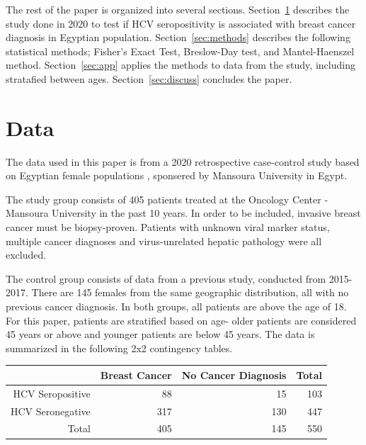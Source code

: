 \documentclass[12pt, titlepage]{article}
\begin{document}
The rest of the paper is organized into several sections. Section~\ref{sec:data}
describes the study done in 2020 to test if HCV seropositivity is associated with 
breast cancer diagnosis in Egyptian population. Section~\ref{sec:methods} 
describes the following statistical methods; Fisher's Exact Test, Breslow-Day test,
and Mantel-Haenszel method. Section~\ref{sec:app} applies the methods to data 
from the study, including stratafied between ages. Section~\ref{sec:discuss} 
concludes the paper.



\section{Data}
\label{sec:data}

The data used in this paper is from a 2020 retrospective case-control 
study based on Egyptian female populations \citep{2020association},
sponsered by Mansoura University in Egypt.

The study group consists of 405 patients treated at the Oncology Center 
- Mansoura University in the past 10 years. In order to be included, 
invasive breast cancer must be biopsy-proven. Patients with unknown 
viral marker status, multiple cancer diagnoses and virus-unrelated 
hepatic pathology were all excluded. 

The control group consists of 
data from a previous study, conducted from 2015-2017. There are 145 
females from the same geographic distribution, all with no previous 
cancer diagnosis. In both groups, all patients are above the age of 
18. For this paper, patients are stratified based on age- older patients 
are considered 45 years or above and younger patients are below 45 years. 
The data is summarized in the following 2x2 contingency tables. 

\vspace{1cm}


\begin{center}
\label{tab:all}
\begin{tabular}{rrrr}
  \toprule
  & Breast Cancer & No Cancer Diagnosis & Total\\ 
  \midrule
  HCV Seropositive & 88 & 15 & 103 \\ 
  HCV Seronegative & 317 & 130 & 447 \\ 
  \midrule
  Total & 405 & 145 & 550 \\ 
  \bottomrule
\end{tabular}
\end{center}
\end{document}
